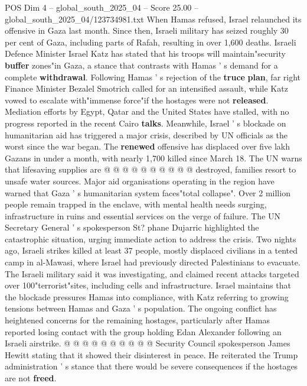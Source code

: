 \begin{textsample}{POS Dim 4 – global\_south\_2025\_04 – Score 25.00 – global\_south\_2025\_04/123734981.txt}
When Hamas refused, Israel relaunched its offensive in Gaza last month.
Since then, Israeli military has seized roughly 30 per cent of Gaza, including parts of Rafah, resulting in over 1,600 deaths.
Israeli Defence Minister Israel Katz has stated that his troops will maintain"security \textbf{buffer} zones"in Gaza, a stance that contrasts with Hamas ' s demand for a complete \textbf{withdrawal}.
Following Hamas ' s rejection of the \textbf{truce} \textbf{plan}, far right Finance Minister Bezalel Smotrich called for an intensified assault, while Katz vowed to escalate with"immense force"if the hostages were not \textbf{released}.
Mediation efforts by Egypt, Qatar and the United States have stalled, with no progress reported in the recent Cairo \textbf{talks}.
Meanwhile, Israel ' s blockade on humanitarian aid has triggered a major crisis, described by UN officials as the worst since the war began.
The \textbf{renewed} offensive has displaced over five lakh Gazans in under a month, with nearly 1,700 killed since March 18.
The UN warns that lifesaving supplies are @ @ @ @ @ @ @ @ @ @ destroyed, families resort to unsafe water sources.
Major aid organisations operating in the region have warned that Gaza ' s humanitarian system faces"total collapse".
Over 2 million people remain trapped in the enclave, with mental health needs surging, infrastructure in ruins and essential services on the verge of failure.
The UN Secretary General ' s spokesperson St? phane Dujarric highlighted the catastrophic situation, urging immediate action to address the crisis.
Two nights ago, Israeli strikes killed at least 37 people, mostly displaced civilians in a tented camp in al-Mawasi, where Israel had previously directed Palestinians to evacuate.
The Israeli military said it was investigating, and claimed recent attacks targeted over 100"terrorist"sites, including cells and infrastructure.
Israel maintains that the blockade pressures Hamas into compliance, with Katz referring to growing tensions between Hamas and Gaza ' s population.
The ongoing conflict has heightened concerns for the remaining hostages, particularly after Hamas reported losing contact with the group holding Edan Alexander following an Israeli airstrike. @ @ @ @ @ @ @ @ @ @ Security Council spokesperson James Hewitt stating that it showed their disinterest in peace.
He reiterated the Trump administration ' s stance that there would be severe consequences if the hostages are not \textbf{freed}.

\end{textsample}
